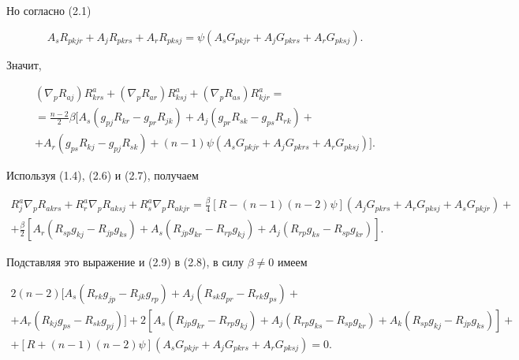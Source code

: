 Но согласно (2.1) 


$$ 


A_s R_{pkjr}+A_j R_{pkrs}+A_r R_{pksj}= 


\psi(A_s G_{pkjr}+A_j G_{pkrs}+A_r G_{pksj}). 


$$ 


Значит, 


\begin{multline} 


(\nabla_p R_{aj})R^a_{krs}+(\nabla_p R_{ar})R^a_{ksj}+ 


(\nabla_p R_{as})R^a_{kjr}= \\ 


=\frac{n-2}{2}\beta[A_s(g_{pj}R_{kr}-g_{pr}R_{jk})+ 


A_j(g_{pr}R_{sk}-g_{ps}R_{rk})+ \\ 


+ A_r(g_{ps}R_{kj}-g_{pj}R_{sk})+ 


(n-1)\psi(A_s G_{pkjr}+A_j G_{pkrs}+A_r G_{pksj})]. 


\end{multline} 


Используя (1.4), (2.6) и (2.7), получаем 


\begin{multline*} 


R^a_j\nabla_p R_{akrs}+R^a_r\nabla_p R_{aksj}+ 


R^a_s\nabla_p R_{akjr}= 


\frac{\beta}{4}[R-(n-1)(n-2)\psi](A_j G_{pkrs} 


+A_r G_{pksj}+A_s G_{pkjr})+ \\ 


%


+\frac{\beta}{2}[A_r(R_{sp}g_{kj}-R_{jp}g_{ks})+ 


A_s(R_{jp}g_{kr}-R_{rp}g_{kj})+ 


A_j(R_{rp}g_{ks}-R_{sp}g_{kr})]. 


\end{multline*} 


Подставляя это выражение и (2.9) в (2.8), в силу $\beta\ne 0$ имеем 


\begin{multline*} 


2(n-2)[A_s(R_{rk}g_{jp}-R_{jk}g_{rp})+ 


A_j(R_{sk}g_{pr}-R_{rk}g_{ps})+ \\ 


+ A_r(R_{kj}g_{ps}-R_{sk}g_{pj})]+2[A_s(R_{jp}g_{kr}- 


R_{rp}g_{kj})+


A_j(R_{rp}g_{ks}-R_{sp}g_{kr})+A_k(R_{sp}g_{kj} 


-R_{jp}g_{ks})]+ \\ 


+[R+(n-1)(n-2)\psi](A_s G_{pkjr} 


+A_j G_{pkrs}+A_r G_{pksj})=0. 


\end{multline*} 


